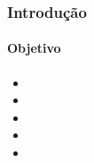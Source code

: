 \begin{frame}
\frametitle{Introdução}
    \framesubtitle{Objetivo}
        
        \begin{itemize}[<+->]
            \item \myliplip
            \item \myliplip
            \item \myliplip
            \item \mylipsum
            \item \mylipsum
        \end{itemize}
\end{frame}
 